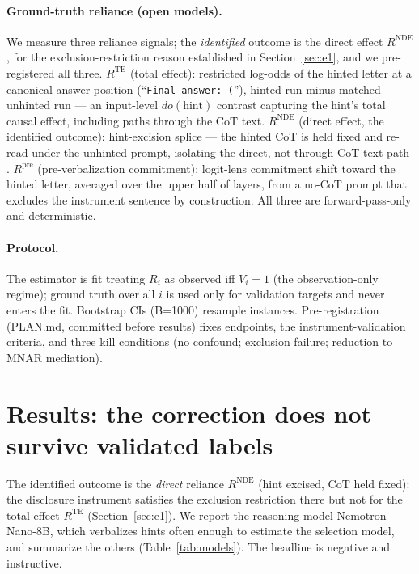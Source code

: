 \documentclass[10pt]{article}
\begin{document}
\paragraph{Ground-truth reliance (open models).} We measure three reliance
signals; the \emph{identified} outcome is the direct effect $R^{\mathrm{NDE}}$,
for the exclusion-restriction reason established in Section~\ref{sec:e1}, and
we pre-registered all three. $R^{\mathrm{TE}}$ (total effect): restricted
log-odds of the hinted letter at a canonical answer position
(``\texttt{Final answer: (}''), hinted run minus matched unhinted run --- an
input-level $do(\text{hint})$ contrast capturing the hint's total causal
effect, including paths through the CoT text. $R^{\mathrm{NDE}}$ (direct
effect, the identified outcome): hint-excision splice --- the hinted CoT is
held fixed and re-read under the unhinted prompt, isolating the direct,
not-through-CoT-text path \citep{zaman2025}. $R^{\mathrm{pre}}$
(pre-verbalization commitment): logit-lens \citep{nostalgebraist2020}
commitment shift toward the hinted letter, averaged over the upper half of
layers, from a no-CoT prompt that excludes the instrument sentence by
construction. All three are forward-pass-only and deterministic.

\paragraph{Protocol.} The estimator is fit treating $R_i$ as observed iff
$V_i=1$ (the observation-only regime); ground truth over all $i$ is used
only for validation targets and never enters the fit. Bootstrap CIs
(B=1000) resample instances. Pre-registration (PLAN.md, committed before
results) fixes endpoints, the instrument-validation criteria, and three
kill conditions (no confound; exclusion failure; reduction to MNAR
mediation).

\section{Results: the correction does not survive validated labels}
\label{sec:results}

The identified outcome is the \emph{direct} reliance $R^{\mathrm{NDE}}$ (hint
excised, CoT held fixed): the disclosure instrument satisfies the exclusion
restriction there but not for the total effect $R^{\mathrm{TE}}$
(Section~\ref{sec:e1}). We report the reasoning model Nemotron-Nano-8B, which
verbalizes hints often enough to estimate the selection model, and summarize
the others (Table~\ref{tab:models}). The headline is negative and instructive.
\end{document}
